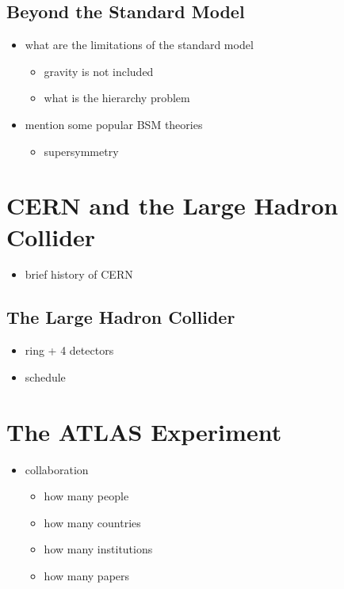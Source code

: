 \subsection{Beyond the Standard Model}

\begin{itemize}
    \color{red}
    \item what are the limitations of the standard model
    \begin{itemize}
        \item gravity is not included
        \item what is the hierarchy problem
    \end{itemize}
    \item mention some popular BSM theories
    \begin{itemize}
        \item supersymmetry
    \end{itemize}
\end{itemize}

\section{CERN and the Large Hadron Collider}

\begin{itemize}
    \color{red}
    \item brief history of CERN
\end{itemize}

\subsection{The Large Hadron Collider}

\begin{itemize}
    \color{red}
    \item ring + 4 detectors
    \item schedule
\end{itemize}

\section{The ATLAS Experiment}

\begin{itemize}
    \color{red}
    \item collaboration
    \begin{itemize}
        \item how many people
        \item how many countries
        \item how many institutions
        \item how many papers
    \end{itemize}
\end{itemize}

